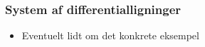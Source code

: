 \begin{frame}
\frametitle{System af differentialligninger}
\begin{itemize}
\item Eventuelt lidt om det konkrete eksempel
\end{itemize}
\end{frame}
